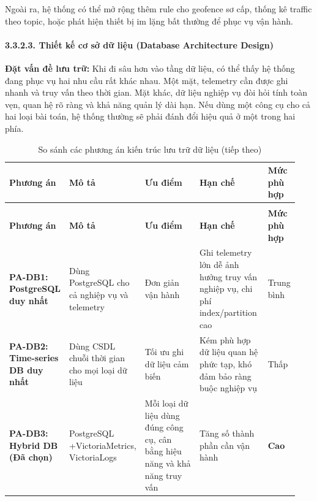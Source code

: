\documentclass[a4paper]{extarticle}
\newcommand{\thesissettableid}[2]{%
  \renewcommand{\thetable}{#1}%
  \renewcommand{\theHtable}{#2}%
}
\begin{document}
Ngoài ra, hệ thống có thể mở rộng thêm rule cho geofence sơ cấp, thống
kê traffic theo topic, hoặc phát hiện thiết bị im lặng bất thường để
phục vụ vận hành.

\paragraph{3.3.2.3. Thiết kế cơ sở dữ liệu (Database Architecture
Design)}\label{3233-thiux1ebft-kux1ebf-cux1a1-sux1edf-dux1eef-liux1ec7u-database-architecture-design}

\textbf{Đặt vấn đề lưu trữ:} Khi đi sâu hơn vào tầng dữ liệu, có thể thấy
hệ thống đang phục vụ hai nhu cầu rất khác nhau. Một mặt, telemetry cần
được ghi nhanh và truy vấn theo thời gian. Mặt khác, dữ liệu nghiệp vụ
đòi hỏi tính toàn vẹn, quan hệ rõ ràng và khả năng quản lý dài hạn. Nếu
dùng một công cụ cho cả hai loại bài toán, hệ thống thường sẽ phải đánh
đổi hiệu quả ở một trong hai phía.


{\thesissettableid{3.18A}{tab-ch3-so-sanh-cac-phuong-an-kien-truc-luu-tru-du-lieu}
\def\LTcaptype{table}
\begin{longtable}{|L{0.149\linewidth}|L{0.233\linewidth}|L{0.236\linewidth}|L{0.241\linewidth}|L{0.085\linewidth}|}
\caption{So sánh các phương án kiến trúc lưu trữ dữ liệu}\label{tab:ch3-so-sanh-cac-phuong-an-kien-truc-luu-tru-du-lieu}\\
\hline \textbf{Phương án} & \textbf{Mô tả} & \textbf{Ưu điểm} & \textbf{Hạn chế} & \textbf{Mức phù hợp} \\
\hline
\endfirsthead
\caption[]{So sánh các phương án kiến trúc lưu trữ dữ liệu (tiếp theo)}\\
\hline \textbf{Phương án} & \textbf{Mô tả} & \textbf{Ưu điểm} & \textbf{Hạn chế} & \textbf{Mức phù hợp} \\
\hline
\endhead
\hline
\endfoot
\endlastfoot
\textbf{PA-DB1: PostgreSQL duy nhất} & Dùng PostgreSQL cho cả nghiệp vụ
và telemetry & Đơn giản vận hành & Ghi telemetry lớn dễ ảnh hưởng truy
vấn nghiệp vụ, chi phí index/partition cao & Trung bình \\\hline
\textbf{PA-DB2: Time-series DB duy nhất} & Dùng CSDL chuỗi thời gian cho
mọi loại dữ liệu & Tối ưu ghi dữ liệu cảm biến & Kém phù hợp dữ liệu
quan hệ phức tạp, khó đảm bảo ràng buộc nghiệp vụ & Thấp \\\hline
\textbf{PA-DB3: Hybrid DB (Đã chọn)} & PostgreSQL +\newline Victoria\-Metrics,\newline
Victoria\-Logs & Mỗi loại dữ liệu dùng đúng công cụ, cân bằng hiệu năng và
khả năng truy vấn & Tăng số thành phần cần vận hành & \textbf{Cao} \\\hline
\end{longtable}
}
\end{document}
